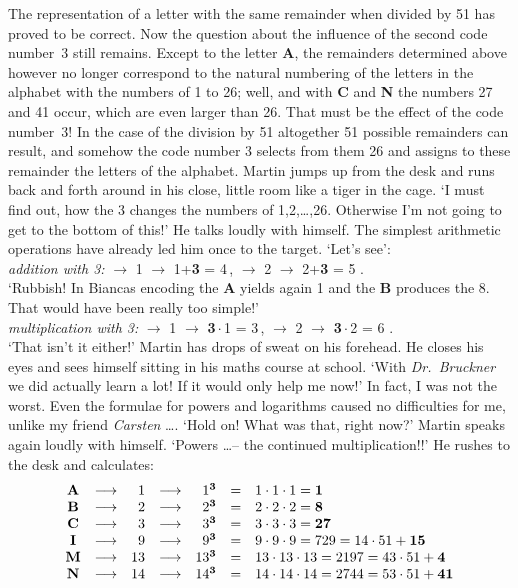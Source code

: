 The representation of a letter with the same remainder when divided by 51 has proved to be correct. 
Now the question about the influence of the second code number~3 still remains. 
Except to the letter {\bf A}, the remainders determined above however no longer correspond to the
natural numbering of the letters in the alphabet with the numbers of 1 to 26; well, and with {\bf C} 
and {\bf N} the numbers 27 and 41 occur, which are even larger than 26.
That must be the effect of the code number~3! 
In the case of the division by 51 altogether 51 possible remainders can result, and somehow the code 
number 3 selects from them 26 and assigns to these remainder the letters of the alphabet.
Martin jumps up from the desk and runs back and forth around in his close, little room like a tiger in the cage.
`I must find out, how the 3 changes the numbers of 1,2,\dots,26. 
Otherwise I'm not going to get to the bottom of this!' He talks loudly with himself. 
The simplest arithmetic operations have already led him once to the target. 
`Let's see': \\ 
{\em addition with 3:}  \(\longrightarrow \) 1 \(\longrightarrow \)
1+{\bf 3} = 4\,,  \(\longrightarrow \) 2 \(\longrightarrow \)
2+{\bf 3} = 5\,\,. \\
`Rubbish! In Biancas encoding the {\bf A} yields again 1 and the {\bf B} produces the 8. 
That would have been really too simple!' \\ 
{\em multiplication with 3:}  \(\longrightarrow \) 1
\(\longrightarrow \) {\bf 3}\,\(\cdot \)\,1 = 3\,, 
\(\longrightarrow \) 2 \(\longrightarrow \) {\bf 3}\,\(\cdot \)\,2 = 6\,\,. \\
`That isn't it either!' Martin has drops of sweat on his forehead. 
He closes his eyes and sees himself sitting in his maths course at school.
`With {\em Dr.~Bruckner \/} we did actually learn a lot! 
If it would only help me now!' 
In fact, I was not the worst. 
Even the formulae for powers and logarithms caused no difficulties for me, unlike my friend {\em Carsten\/} \dots. 
`Hold on! What was that, right now?' 
Martin speaks again loudly with himself. 
`Powers \dots -- the continued multiplication!!' 
He rushes to the desk and calculates: 
\[\begin{array}{ccrcrcl}
{\bf A} & \longrightarrow & 1 & \longrightarrow & 1^{{\bf 3}} & = & 1\cdot 1
\cdot 1 = {\bf 1} \\
{\bf B} & \longrightarrow & 2 & \longrightarrow & 2^{{\bf 3}} & = & 2\cdot 2
\cdot 2 = {\bf 8} \\
{\bf C} & \longrightarrow & 3 & \longrightarrow & 3^{{\bf 3}} & = & 3\cdot 3
\cdot 3 = {\bf 27} \\
{\bf I} & \longrightarrow & 9 & \longrightarrow & 9^{{\bf 3}} & = & 9\cdot 9
\cdot 9 = 729 = 14\cdot 51 + {\bf 15} \\
{\bf M} & \longrightarrow & 13 & \longrightarrow & 13^{{\bf 3}} & = & 13\cdot 13 \cdot 13 = 2197 = 43\cdot 51 + {\bf 4} \\
{\bf N} & \longrightarrow & 14 & \longrightarrow & 14^{{\bf 3}} & = & 14\cdot
14\cdot 14 = 2744 = 53\cdot 51 + {\bf 41}
\end{array} \]
